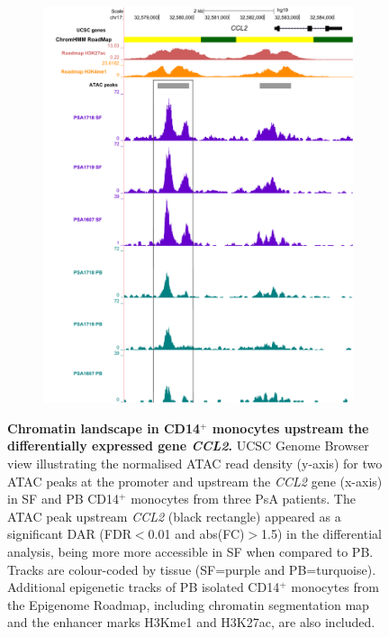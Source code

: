 \bigskip
\begin{figure}[H]
\centering
\begin{subfigure}[b]{0.55\textwidth}
\centering 
\includegraphics[width=\textwidth]{./Results3/pdfs/ATAC_PSA_CD14_UCSC_CCL2_track}
\caption{}
\end{subfigure}
\caption[Chromatin landscape in CD14$^+$ monocytes upstream the differentially expressed gene \textit{CCL2}.]{\textbf{Chromatin landscape in CD14$^+$ monocytes upstream the differentially expressed gene \textit{CCL2}.} UCSC Genome Browser view illustrating the normalised ATAC read density (y-axis) for two ATAC peaks at the promoter and upstream the \textit{CCL2} gene (x-axis) in SF and PB CD14$^+$ monocytes from three PsA patients. The ATAC peak upstream \textit{CCL2} (black rectangle) appeared as a significant DAR (FDR$<$0.01 and abs(FC)$>$1.5) in the differential analysis, being more more accessible in SF when compared to PB. Tracks are colour-coded by tissue (SF=purple and PB=turquoise). Additional epigenetic tracks of PB isolated CD14$^+$ monocytes from the Epigenome Roadmap, including chromatin segmentation map and the enhancer marks H3Kme1 and H3K27ac, are also included.}
\label{figure:PsA_10X_qPCR_ATAC_CD14_CCL2}
\end{figure}


